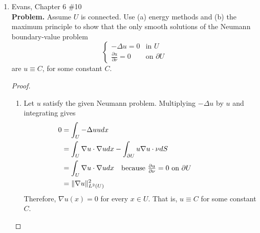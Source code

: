\documentclass[a4paper]{article}
\newenvironment{problem}{\textbf{Problem.}}{}
\begin{document}
\begin{enumerate}
\begin{proof}
      Adding $\lambda \|u^2\|_{L^\infty(U)}$ to both sides and using the maximum principle gives
      \begin{align*}
        \left\| |Du|^2 \right\|_{L^\infty(U)} &\leq \left\| |Du|^2 \right\|_{L^\infty(\partial U)} + 2\lambda \|u^2\|_{L^\infty(\partial U)} \\
        &\leq \left( \left\| Du \right\|_{L^\infty(\partial U)} + \sqrt{2 \lambda} \|u\|_{L^\infty(\partial U)} \right)^2
      \end{align*}

      Taking square roots gives
      \[ \| Du \|_{L^\infty(U)} \leq C \left( \| Du \|_{L^\infty(\partial U)} + \|u\|_{L^\infty(\partial U)} \right) \]
      with $C = \max \{1, \sqrt{2 \lambda} \}$.

    \end{proof}

  \item Evans, Chapter 6 \#10 \\
    \begin{problem}
      Assume $U$ is connected. Use (a) energy methods and (b) the maximum principle to show that the only smooth solutions of the Neumann
      boundary-value problem
      \[ \begin{cases}
          - \Delta u = 0 &\text{in } U \\
          \frac{\partial u}{\partial \nu} = 0 &\text{on } \partial U
      \end{cases} \]
      are $u \equiv C$, for some constant $C$.
    \end{problem}

      \begin{proof}
        \begin{enumerate}
          \item
            Let $u$ satisfy the given Neumann problem. Multiplying $-\Delta u$ by $u$ and integrating gives
            \begin{align*}
              0 &= \int_{U}^{} - \Delta u u dx \\
              &= \int_{U}^{} \nabla u \cdot \nabla u dx - \int_{\partial U}^{} u \nabla u \cdot \nu dS \\
              &= \int_{U}^{} \nabla u \cdot \nabla u dx \quad \parbox{5cm}{because $\frac{\partial u}{\partial \nu} =0$ on $\partial U$} \\
              &= \| \nabla u \|_{L^2(U)}^2
            \end{align*}
            Therefore, $\nabla u (x) = 0$ for every $x \in U$. That is, $u \equiv C$ for some constant $C$.


\end{enumerate}
\end{proof}
\end{enumerate}
\end{document}
